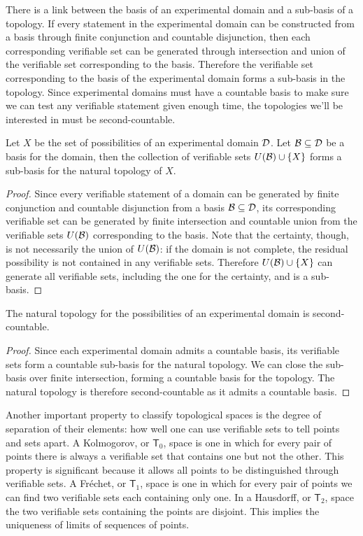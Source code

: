 	There is a link between the basis of an experimental domain and a sub-basis of a topology. If every statement in the experimental domain can be constructed from a basis through finite conjunction and countable disjunction, then each corresponding verifiable set can be generated through intersection and union of the verifiable set corresponding to the basis. Therefore the verifiable set corresponding to the basis of the experimental domain forms a sub-basis in the topology. Since experimental domains must have a countable basis to make sure we can test any verifiable statement given enough time, the topologies we'll be interested in must be second-countable.
	
	\begin{mathSection}
		\begin{prop}
			Let $X$ be the set of possibilities of an experimental domain $\mathcal{D}$. Let $\mathcal{B} \subseteq \mathcal{D}$ be a basis for the domain, then the collection of verifiable sets $U(\mathcal{B})\cup\{X\}$ forms a sub-basis for the natural topology of $X$.
		\end{prop}
		\begin{proof}
			Since every verifiable statement of a domain can be generated by finite conjunction and countable disjunction from a basis $\mathcal{B} \subseteq \mathcal{D}$, its corresponding verifiable set can be generated by finite intersection and countable union from the verifiable sets $U(\mathcal{B})$ corresponding to the basis. Note that the certainty, though, is not necessarily the union of $U(\mathcal{B})$: if the domain is not complete, the residual possibility is not contained in any verifiable sets. Therefore $U(\mathcal{B})\cup\{X\}$ can generate all verifiable sets, including the one for the certainty, and is a sub-basis.
		\end{proof}
		\begin{prop}
			The natural topology for the possibilities of an experimental domain is second-countable.
		\end{prop}
		\begin{proof}
			Since each experimental domain admits a countable basis, its verifiable sets form a countable sub-basis for the natural topology. We can close the sub-basis over finite intersection, forming a countable basis for the topology. The natural topology is therefore second-countable as it admits a countable basis.
		\end{proof}
	\end{mathSection}
	
	Another important property to classify topological spaces is the degree of separation of their elements: how well one can use verifiable sets to tell points and sets apart. A Kolmogorov, or $\mathsf{T}_0$, space is one in which for every pair of points there is always a verifiable set that contains one but not the other. This property is significant because it allows all points to be distinguished through verifiable sets. A Fr\'echet, or $\mathsf{T}_1$, space is one in which for every pair of points we can find two verifiable sets each containing only one. In a Hausdorff, or $\mathsf{T}_2$, space the two verifiable sets containing the points are disjoint. This implies the uniqueness of limits of sequences of points.
	
